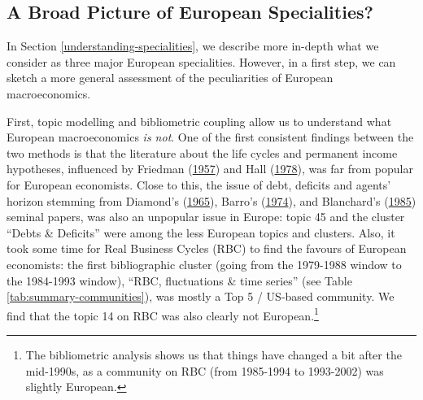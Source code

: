 \documentclass[]{elsarticle} %
\begin{document}
\hypertarget{a-broad-picture-of-european-specialities}{%
\subsection{A Broad Picture of European
Specialities?}\label{a-broad-picture-of-european-specialities}}

In Section \ref{understanding-specialities}, we describe more in-depth
what we consider as three major European specialities. However, in a
first step, we can sketch a more general assessment of the peculiarities
of European macroeconomics.

First, topic modelling and bibliometric coupling allow us to understand
what European macroeconomics \emph{is not}. One of the first consistent
findings between the two methods is that the literature about the life
cycles and permanent income hypotheses, influenced by Friedman
(\protect\hyperlink{ref-friedman1957}{1957}) and Hall
(\protect\hyperlink{ref-hall1978b}{1978}), was far from popular for
European economists. Close to this, the issue of debt, deficits and
agents' horizon stemming from Diamond's
(\protect\hyperlink{ref-diamond1965}{1965}), Barro's
(\protect\hyperlink{ref-barro1974}{1974}), and Blanchard's
(\protect\hyperlink{ref-blanchard1985}{1985}) seminal papers, was also
an unpopular issue in Europe: topic 45 and the cluster ``Debts \&
Deficits'' were among the less European topics and clusters. Also, it
took some time for Real Business Cycles (RBC) to find the favours of
European economists: the first bibliographic cluster (going from the
1979-1988 window to the 1984-1993 window), ``RBC, fluctuations \& time
series'' (see Table \ref{tab:summary-communities}), was mostly a Top 5 /
US-based community. We find that the topic 14 on RBC was also clearly
not European.\footnote{The bibliometric analysis shows us that things
  have changed a bit after the mid-1990s, as a community on RBC (from
  1985-1994 to 1993-2002) was slightly European.}
\end{document}
